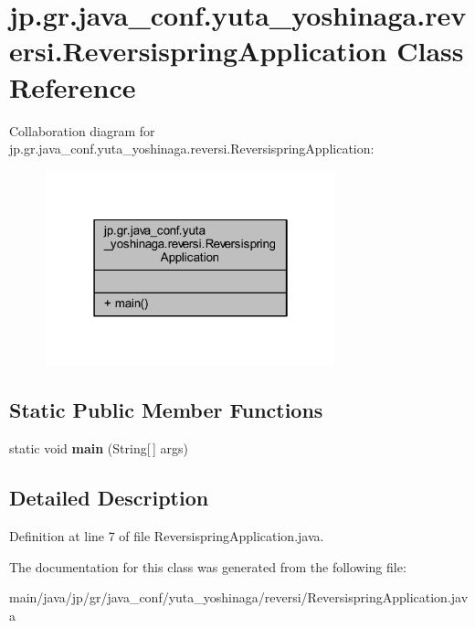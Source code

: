\hypertarget{classjp_1_1gr_1_1java__conf_1_1yuta__yoshinaga_1_1reversi_1_1_reversispring_application}{}\section{jp.\+gr.\+java\+\_\+conf.\+yuta\+\_\+yoshinaga.\+reversi.\+Reversispring\+Application Class Reference}
\label{classjp_1_1gr_1_1java__conf_1_1yuta__yoshinaga_1_1reversi_1_1_reversispring_application}


Collaboration diagram for jp.\+gr.\+java\+\_\+conf.\+yuta\+\_\+yoshinaga.\+reversi.\+Reversispring\+Application\+:
\nopagebreak
\begin{figure}[H]
\begin{center}
\leavevmode
\includegraphics[width=238pt]{classjp_1_1gr_1_1java__conf_1_1yuta__yoshinaga_1_1reversi_1_1_reversispring_application__coll__graph}
\end{center}
\end{figure}
\subsection*{Static Public Member Functions}
\begin{DoxyCompactItemize}
\item 
\mbox{\label{classjp_1_1gr_1_1java__conf_1_1yuta__yoshinaga_1_1reversi_1_1_reversispring_application_a129b100921b97419c6ca693228d77204}} 
static void {\bfseries main} (String\mbox{[}$\,$\mbox{]} args)
\end{DoxyCompactItemize}


\subsection{Detailed Description}


Definition at line 7 of file Reversispring\+Application.\+java.



The documentation for this class was generated from the following file\+:\begin{DoxyCompactItemize}
\item 
main/java/jp/gr/java\+\_\+conf/yuta\+\_\+yoshinaga/reversi/Reversispring\+Application.\+java\end{DoxyCompactItemize}
